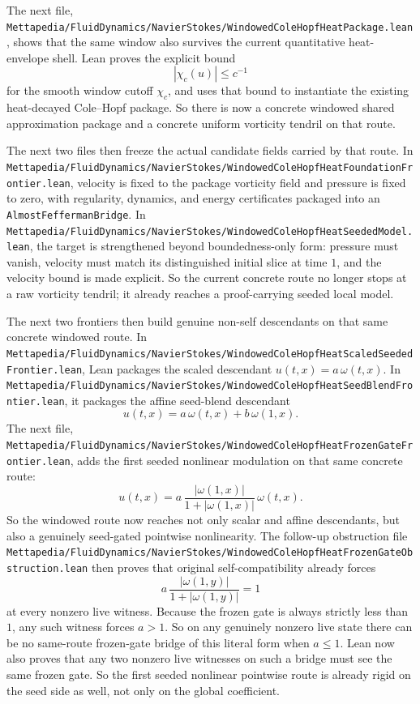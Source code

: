 \documentclass[11pt]{article}
\theoremstyle{remark}
\begin{document}
The next file,
\texttt{Mettapedia/FluidDynamics/NavierStokes/WindowedColeHopfHeatPackage.lean},
shows that the same window also survives the current quantitative heat-envelope
shell.  Lean proves the explicit bound
\[
  |\chi_c(u)| \le c^{-1}
\]
for the smooth window cutoff \(\chi_c\), and uses that bound to instantiate the
existing heat-decayed Cole--Hopf package.  So there is now a concrete windowed
shared approximation package and a concrete uniform vorticity tendril on that
route.

The next two files then freeze the actual candidate fields carried by that
route.  In
\texttt{Mettapedia/FluidDynamics/NavierStokes/WindowedColeHopfHeatFoundationFrontier.lean},
velocity is fixed to the package vorticity field and pressure is fixed to zero,
with regularity, dynamics, and energy certificates packaged into an
\texttt{AlmostFeffermanBridge}.  In
\texttt{Mettapedia/FluidDynamics/NavierStokes/WindowedColeHopfHeatSeededModel.lean},
the target is strengthened beyond boundedness-only form: pressure must vanish,
velocity must match its distinguished initial slice at time \(1\), and the
velocity bound is made explicit.  So the current concrete route no longer stops
at a raw vorticity tendril; it already reaches a proof-carrying seeded local
model.

The next two frontiers then build genuine non-self descendants on that same
concrete windowed route.  In
\texttt{Mettapedia/FluidDynamics/NavierStokes/WindowedColeHopfHeatScaledSeededFrontier.lean},
Lean packages the scaled descendant \(u(t,x)=a\,\omega(t,x)\).  In
\texttt{Mettapedia/FluidDynamics/NavierStokes/WindowedColeHopfHeatSeedBlendFrontier.lean},
it packages the affine seed-blend descendant
\[
  u(t,x)=a\,\omega(t,x)+b\,\omega(1,x).
\]
The next file,
\texttt{Mettapedia/FluidDynamics/NavierStokes/WindowedColeHopfHeatFrozenGateFrontier.lean},
adds the first seeded nonlinear modulation on that same concrete route:
\[
  u(t,x)=a\,\frac{|\omega(1,x)|}{1+|\omega(1,x)|}\,\omega(t,x).
\]
So the windowed route now reaches not only scalar and affine descendants, but
also a genuinely seed-gated pointwise nonlinearity.  The follow-up obstruction
file
\texttt{Mettapedia/FluidDynamics/NavierStokes/WindowedColeHopfHeatFrozenGateObstruction.lean}
then proves that original self-compatibility already forces
\[
  a\,\frac{|\omega(1,y)|}{1+|\omega(1,y)|}=1
\]
at every nonzero live witness.  Because the frozen gate is always strictly less
than \(1\), any such witness forces \(a>1\).  So on any genuinely nonzero live
state there can be no same-route frozen-gate bridge of this literal form when
\(a \le 1\).  Lean now also proves that any two nonzero live witnesses on such
a bridge must see the same frozen gate.  So the first seeded nonlinear
pointwise route is already rigid on the seed side as well, not only on the
global coefficient.
\end{document}
